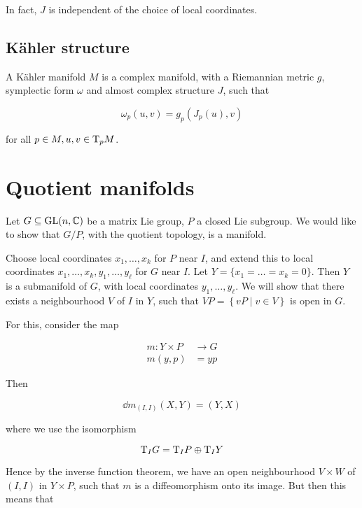 \documentclass{report}
\begin{document}
In fact, \(J\) is independent of the choice of local coordinates.

\subsection{K\"ahler structure}

\begin{definition}
     A K\"ahler manifold \(M\) is a complex manifold, with a Riemannian metric \(g\), symplectic form \(\omega\) and almost complex structure \(J\), such that

    \[\omega_p(u, v) = g_p(J_p(u), v)\]

    for all \(p \in M, u, v \in \mathrm{T}_pM\).
\end{definition}

\section{Quotient manifolds}

\label{sec:quotient}

Let \(G \subseteq \operatorname{GL}(n, \mathbb{C})\) be a matrix Lie group, \(P\) a closed Lie subgroup. We would like to show that \(G/P\), with the quotient topology, is a manifold.

Choose local coordinates \(x_1, \dots, x_k\) for \(P\) near \(I\), and extend this to local coordinates \(x_1, \dots, x_k, y_1, \dots, y_\ell\) for \(G\) near \(I\). Let \(Y = \{x_1 = \dots = x_k = 0\}\). Then \(Y\) is a submanifold of \(G\), with local coordinates \(y_1, \dots, y_\ell\). We will show that there exists a neighbourhood \(V\) of \(I\) in \(Y\), such that \(VP = \left\{vP \mid v \in V\right\}\) is open in \(G\).

For this, consider the map

\begin{align*}
    m :Y \times P &\to G \\
    m(y, p) &= yp
\end{align*}

Then

\[\dd m_{(I, I)}(X, Y) = (Y, X)\]

where we use the isomorphism

\[\mathrm{T}_I G = \mathrm{T}_I P \oplus \mathrm{T}_I Y\]

Hence by the inverse function theorem, we have an open neighbourhood \(V \times W\) of \((I, I)\) in \(Y \times P\), such that \(m\) is a diffeomorphism onto its image. But then this means that
\end{document}
